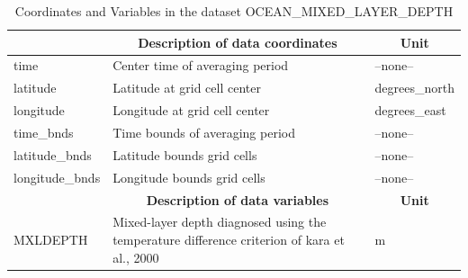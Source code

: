 \begin{longtable}{|m{}|m{}|m{}|}
\caption{Coordinates and Variables in the dataset OCEAN\_MIXED\_LAYER\_DEPTH}
\label{tab:table-<xarray.Dataset> Size: 1MB
Dimensions:         (time: 1, latitude: 360, longitude: 720, nv: 2)
Coordinates:
  * time            (time) datetime64[ns] 8B 2017-12-29T12:00:00
  * latitude        (latitude) float32 1kB -89.75 -89.25 -88.75 ... 89.25 89.75
  * longitude       (longitude) float32 3kB -179.8 -179.2 -178.8 ... 179.2 179.8
    time_bnds       (time, nv) datetime64[ns] 16B ...
    latitude_bnds   (latitude, nv) float32 3kB ...
    longitude_bnds  (longitude, nv) float32 6kB ...
Dimensions without coordinates: nv
Data variables:
    MXLDEPTH        (time, latitude, longitude) float32 1MB ...
Attributes: (12/57)
    acknowledgement:              This research was carried out by the Jet Pr...
    author:                       Ian Fenty and Ou Wang
    cdm_data_type:                Grid
    comment:                      Fields provided on a regular lat-lon grid. ...
    Conventions:                  CF-1.8, ACDD-1.3
    coordinates_comment:          Note: the global 'coordinates' attribute de...
    ...                           ...
    time_coverage_duration:       P1D
    time_coverage_end:            2017-12-30T00:00:00
    time_coverage_resolution:     P1D
    time_coverage_start:          2017-12-29T00:00:00
    title:                        ECCO Ocean Mixed Layer Depth - Daily Mean 0...
    uuid:                         94a8a782-4052-11eb-a37d-0cc47a3f7e1d-fields} \\ 
\hline \endhead \hline \endfoot
\rowcolor{lightgray} \multicolumn{1}{|c|}{\textbf{Coordinates}} & \multicolumn{1}{|c|}{\textbf{Description of data coordinates}} &  \multicolumn{1}{|c|}{\textbf{Unit}}\\ \hline
time &Center time of averaging period &--none--  \\ \hline
latitude &Latitude at grid cell center &degrees\_north  \\ \hline
longitude &Longitude at grid cell center &degrees\_east  \\ \hline
time\_bnds &Time bounds of averaging period &--none--  \\ \hline
latitude\_bnds &Latitude bounds grid cells &--none--  \\ \hline
longitude\_bnds &Longitude bounds grid cells &--none--  \\ \hline
\rowcolor{lightgray} \multicolumn{1}{|c|}{\textbf{Variables}} & \multicolumn{1}{|c|}{\textbf{Description of data variables}} &  \multicolumn{1}{|c|}{\textbf{Unit}}\\ \hline
MXLDEPTH &Mixed-layer depth diagnosed using the temperature difference criterion of kara et al., 2000 &m  \\ \hline
\end{longtable}


